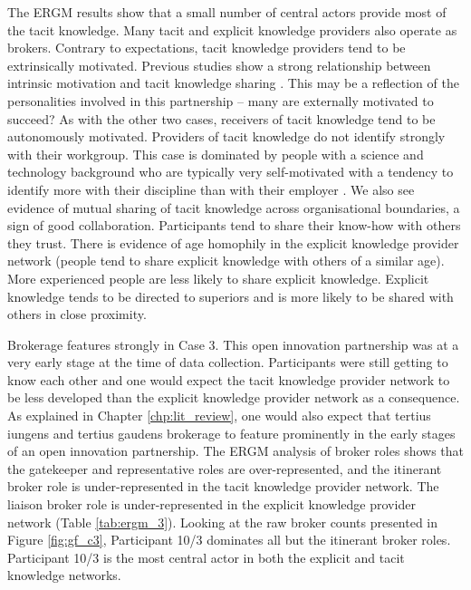 The ERGM results show that a small number of central actors provide most of the tacit knowledge. Many tacit and explicit knowledge providers also operate as brokers. Contrary to expectations, tacit knowledge providers tend to be extrinsically motivated. Previous studies show a strong relationship between intrinsic motivation and tacit knowledge sharing \citep[e.g.][]{osterloh2000motivation,kaser2001knowledge,hau2013effects,shao2017charismatic}. This may be a reflection of the personalities involved in this partnership -- many are externally motivated to succeed? As with the other two cases, receivers of tacit knowledge tend to be autonomously motivated. Providers of tacit knowledge do not identify strongly with their workgroup. This case is dominated by people with a science and technology background who are typically very self-motivated with a tendency to identify more with their discipline than with their employer \citep{stephan1996economics}. We also see evidence of mutual sharing of tacit knowledge across organisational boundaries, a sign of good collaboration. Participants tend to share their know-how with others they trust. There is evidence of age homophily in the explicit knowledge provider network (people tend to share explicit knowledge with others of a similar age). More experienced people are less likely to share explicit knowledge. Explicit knowledge tends to be directed to superiors and is more likely to be shared with others in close proximity. \medskip

Brokerage features strongly in Case 3. This open innovation partnership was at a very early stage at the time of data collection. Participants were still getting to know each other and one would expect the tacit knowledge provider network to be less developed than the explicit knowledge provider network as a consequence. As explained in Chapter \ref{chp:lit_review}, one would also expect that tertius iungens and tertius gaudens brokerage to feature prominently in the early stages of an open innovation partnership. The ERGM analysis of broker roles shows that the gatekeeper and representative roles are over-represented, and the itinerant broker role is under-represented in the tacit knowledge provider network. The liaison broker role is under-represented in the explicit knowledge provider network (Table \ref{tab:ergm_3}). Looking at the raw broker counts presented in Figure \ref{fig:gf_c3}, Participant 10/3 dominates all but the itinerant broker roles. Participant 10/3 is the most central actor in both the explicit and tacit knowledge networks.

